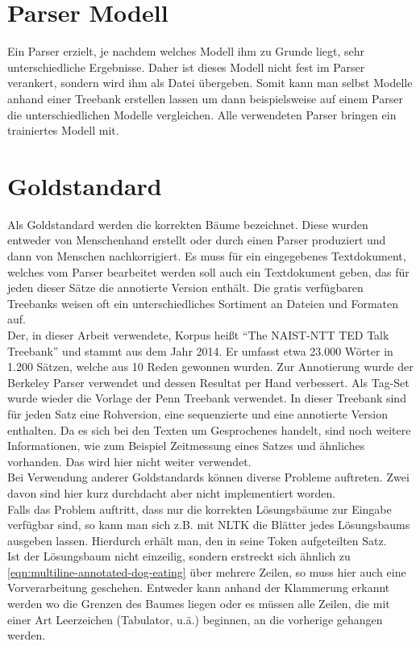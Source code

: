 \section{Parser Modell}
Ein Parser erzielt, je nachdem welches Modell ihm zu Grunde liegt, sehr unterschiedliche Ergebnisse. Daher ist dieses Modell nicht fest im Parser verankert, sondern wird ihm als Datei übergeben. Somit kann man selbst Modelle anhand einer Treebank erstellen lassen um dann beispielsweise auf einem Parser die unterschiedlichen Modelle vergleichen. Alle verwendeten Parser bringen ein trainiertes Modell mit.  %

\section{Goldstandard}
Als Goldstandard werden die korrekten Bäume bezeichnet. Diese wurden entweder von Menschenhand erstellt oder durch einen Parser produziert und dann von Menschen nachkorrigiert. Es muss für ein eingegebenes Textdokument, welches vom Parser bearbeitet werden soll auch ein Textdokument geben, das für jeden dieser Sätze die annotierte Version enthält. Die gratis verfügbaren Treebanks weisen oft ein unterschiedliches Sortiment an Dateien und Formaten auf.\\
Der, in dieser Arbeit verwendete, Korpus heißt ``The NAIST-NTT TED Talk Treebank'' \cite{tedtalks} und stammt aus dem Jahr 2014. Er umfasst etwa 23.000 Wörter in 1.200 Sätzen, welche aus 10 Reden gewonnen wurden. Zur Annotierung wurde der Berkeley Parser verwendet und dessen Resultat per Hand verbessert. Als Tag-Set wurde wieder die Vorlage der Penn Treebank verwendet. 
In dieser Treebank sind für jeden Satz eine Rohversion, eine sequenzierte und eine annotierte Version enthalten. Da es sich bei den Texten um Gesprochenes handelt, sind noch weitere Informationen, wie zum Beispiel Zeitmessung eines Satzes und ähnliches vorhanden. Das wird hier nicht weiter verwendet.\\
Bei Verwendung anderer Goldstandards können diverse Probleme auftreten. Zwei davon sind hier kurz durchdacht aber nicht implementiert worden.\\
Falls das Problem auftritt, dass nur die korrekten Lösungsbäume zur Eingabe verfügbar sind, so kann man sich z.B. mit NLTK \cite{nltk} %
die Blätter jedes Lösungsbaums ausgeben lassen. Hierdurch erhält man, den in seine Token aufgeteilten Satz.\\
Ist der Lösungsbaum nicht einzeilig, sondern erstreckt sich ähnlich zu \ref{eqn:multiline-annotated-dog-eating}  über mehrere Zeilen, so muss hier auch eine Vorverarbeitung geschehen. Entweder kann anhand der Klammerung erkannt werden wo die Grenzen des Baumes liegen oder es müssen alle Zeilen, die mit einer Art Leerzeichen (Tabulator, u.ä.) beginnen, an die vorherige gehangen werden.

